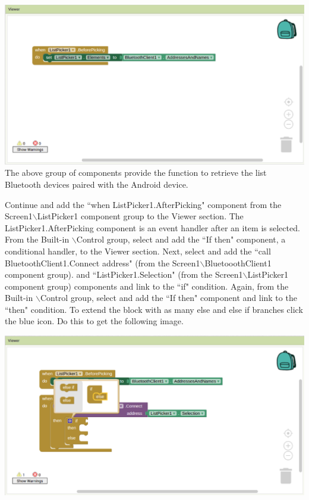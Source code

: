\documentclass[journal,12pt,twocolumn]{IEEEtran}
\begin{document}
%
\includegraphics[width=\columnwidth]{./figs/9.png.eps}
\\
The above group of components provide the function to retrieve the list Bluetooth devices paired with the Android device.
\begin{problem}
Continue and add the ``when ListPicker1.AfterPicking" component from the  Screen1$\backslash$ListPicker1 component group to the Viewer section. The ListPicker1.AfterPicking component is an event handler after an item is selected. From the Built-in $\backslash$Control group, select and add the ``If then" component, a conditional handler, to the Viewer section.  
Next, select and add the ``call BluetoothClient1.Connect address" (from the Screen1$\backslash$BluetooothClient1 component group). and ``ListPicker1.Selection" (from the Screen1$\backslash$ListPicker1 component group) components and link to the ``if" condition. Again, from the Built-in $\backslash$Control group, select and add the ``If then" component and link to the ``then" condition. To extend the block with as many else and else if branches click the blue icon.  Do this to get the following image.
\end{problem}
%
\includegraphics[width=\columnwidth]{./figs/10.png.eps}
\end{document}
